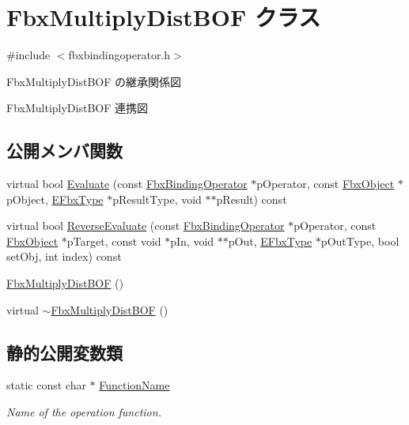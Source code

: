 \hypertarget{class_fbx_multiply_dist_b_o_f}{}\section{Fbx\+Multiply\+Dist\+B\+OF クラス}
\label{class_fbx_multiply_dist_b_o_f}


{\ttfamily \#include $<$fbxbindingoperator.\+h$>$}



Fbx\+Multiply\+Dist\+B\+OF の継承関係図


Fbx\+Multiply\+Dist\+B\+OF 連携図
\subsection*{公開メンバ関数}
\begin{DoxyCompactItemize}
\item 
virtual bool \hyperlink{class_fbx_multiply_dist_b_o_f_a3c6639f5d765181313578955f38996a4}{Evaluate} (const \hyperlink{class_fbx_binding_operator}{Fbx\+Binding\+Operator} $\ast$p\+Operator, const \hyperlink{class_fbx_object}{Fbx\+Object} $\ast$p\+Object, \hyperlink{fbxpropertytypes_8h_a73913a5ddfb20e57c6f25e9e6784bd92}{E\+Fbx\+Type} $\ast$p\+Result\+Type, void $\ast$$\ast$p\+Result) const
\item 
virtual bool \hyperlink{class_fbx_multiply_dist_b_o_f_af5eef2d2b8168d2be835a1643fa35ca1}{Reverse\+Evaluate} (const \hyperlink{class_fbx_binding_operator}{Fbx\+Binding\+Operator} $\ast$p\+Operator, const \hyperlink{class_fbx_object}{Fbx\+Object} $\ast$p\+Target, const void $\ast$p\+In, void $\ast$$\ast$p\+Out, \hyperlink{fbxpropertytypes_8h_a73913a5ddfb20e57c6f25e9e6784bd92}{E\+Fbx\+Type} $\ast$p\+Out\+Type, bool set\+Obj, int index) const
\item 
\hyperlink{class_fbx_multiply_dist_b_o_f_a2daa21f8e0f9f823cfee66d39a8238ac}{Fbx\+Multiply\+Dist\+B\+OF} ()
\item 
virtual \hyperlink{class_fbx_multiply_dist_b_o_f_a76c0a1ebc3ce7fd958414895cb7602af}{$\sim$\+Fbx\+Multiply\+Dist\+B\+OF} ()
\end{DoxyCompactItemize}
\subsection*{静的公開変数類}
\begin{DoxyCompactItemize}
\item 
static const char $\ast$ \hyperlink{class_fbx_multiply_dist_b_o_f_a94b148cde29c7d50de35d8da207ecf6a}{Function\+Name}
\begin{DoxyCompactList}\small\item\em Name of the operation function. \end{DoxyCompactList}\end{DoxyCompactItemize}


